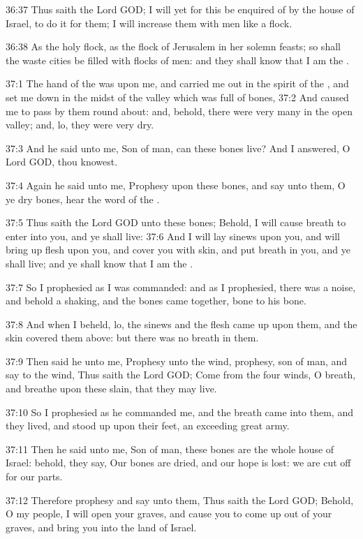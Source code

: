 36:37 Thus saith the Lord GOD; I will yet for this be enquired of by the house of Israel, to do it for them; I will increase them with men like a flock.

36:38 As the holy flock, as the flock of Jerusalem in her solemn feasts; so shall the waste cities be filled with flocks of men: and they shall know that I am the \LORD.

37:1 The hand of the \LORD was upon me, and carried me out in the spirit of the \LORD, and set me down in the midst of the valley which was full of bones, 37:2 And caused me to pass by them round about: and, behold, there were very many in the open valley; and, lo, they were very dry.

37:3 And he said unto me, Son of man, can these bones live? And I answered, O Lord GOD, thou knowest.

37:4 Again he said unto me, Prophesy upon these bones, and say unto them, O ye dry bones, hear the word of the \LORD.

37:5 Thus saith the Lord GOD unto these bones; Behold, I will cause breath to enter into you, and ye shall live: 37:6 And I will lay sinews upon you, and will bring up flesh upon you, and cover you with skin, and put breath in you, and ye shall live; and ye shall know that I am the \LORD.

37:7 So I prophesied as I was commanded: and as I prophesied, there was a noise, and behold a shaking, and the bones came together, bone to his bone.

37:8 And when I beheld, lo, the sinews and the flesh came up upon them, and the skin covered them above: but there was no breath in them.

37:9 Then said he unto me, Prophesy unto the wind, prophesy, son of man, and say to the wind, Thus saith the Lord GOD; Come from the four winds, O breath, and breathe upon these slain, that they may live.

37:10 So I prophesied as he commanded me, and the breath came into them, and they lived, and stood up upon their feet, an exceeding great army.

37:11 Then he said unto me, Son of man, these bones are the whole house of Israel: behold, they say, Our bones are dried, and our hope is lost: we are cut off for our parts.

37:12 Therefore prophesy and say unto them, Thus saith the Lord GOD; Behold, O my people, I will open your graves, and cause you to come up out of your graves, and bring you into the land of Israel.

